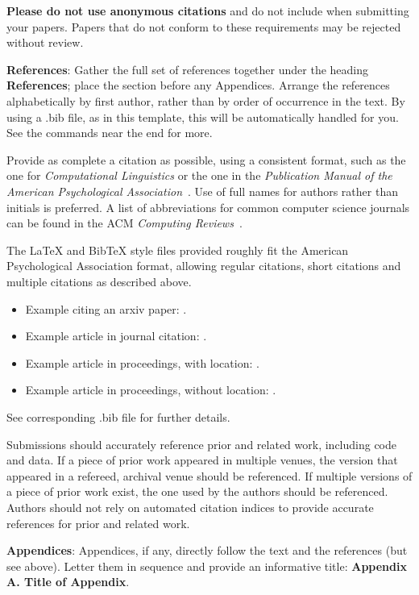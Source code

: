 \documentclass[11pt,a4paper]{article}
\begin{document}
\textbf{Please do not use anonymous citations} and do not include
 when submitting your papers. Papers that do not
conform to these requirements may be rejected without review.

\textbf{References}: Gather the full set of references together under
the heading {\bf References}; place the section before any Appendices. 
Arrange the references alphabetically
by first author, rather than by order of occurrence in the text.
By using a .bib file, as in this template, this will be automatically 
handled for you. See the \verb|| commands near the end for more.

Provide as complete a citation as possible, using a consistent format,
such as the one for {\em Computational Linguistics\/} or the one in the 
{\em Publication Manual of the American 
Psychological Association\/}~\cite{APA:83}. Use of full names for
authors rather than initials is preferred. A list of abbreviations
for common computer science journals can be found in the ACM 
{\em Computing Reviews\/}~\cite{ACM:83}.

The \LaTeX{} and Bib\TeX{} style files provided roughly fit the
American Psychological Association format, allowing regular citations, 
short citations and multiple citations as described above.  

\begin{itemize}
\item Example citing an arxiv paper: \cite{rasooli-tetrault-2015}. 
\item Example article in journal citation: \cite{Ando2005}.
\item Example article in proceedings, with location: \cite{borsch2011}.
\item Example article in proceedings, without location: \cite{andrew2007scalable}.
\end{itemize}
See corresponding .bib file for further details.

Submissions should accurately reference prior and related work, including code and data. If a piece of prior work appeared in multiple venues, the version that appeared in a refereed, archival venue should be referenced. If multiple versions of a piece of prior work exist, the one used by the authors should be referenced. Authors should not rely on automated citation indices to provide accurate references for prior and related work.

{\bf Appendices}: Appendices, if any, directly follow the text and the
references (but see above).  Letter them in sequence and provide an
informative title: {\bf Appendix A. Title of Appendix}.
\end{document}
